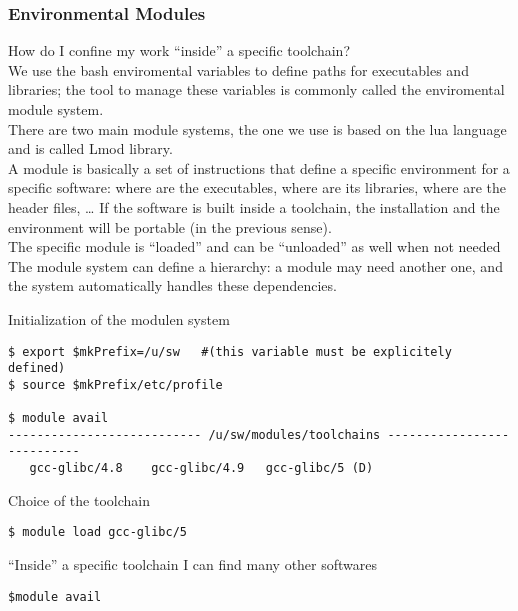 \documentclass[9pt]{beamer}
\begin{document}
\begin{frame}
\frametitle{Environmental Modules}

How do I confine my work “inside” a specific toolchain?\\[3mm]

We use the bash enviromental variables to define paths for executables and libraries; the tool to manage these variables is commonly called 
the enviromental module system.\\[3mm]

There are two main module systems, the one we use is based on the lua language and is called Lmod library.\\[3mm]

A module is basically a set of instructions that define a specific environment for a specific software: where are the executables, where are its libraries, where are the header files, … 
If the software is built inside a toolchain, the installation and the environment  will be portable (in the previous sense).\\[3mm]

The specific module is “loaded” and can be “unloaded” as well when not needed\\[3mm]

The module system can define a hierarchy: a module may need another one, and the system automatically handles these dependencies.

\end{frame}

\begin{frame}[fragile]

Initialization of the modulen  system

\begin{verbatim}
$ export $mkPrefix=/u/sw   #(this variable must be explicitely defined)
$ source $mkPrefix/etc/profile

$ module avail
--------------------------- /u/sw/modules/toolchains ---------------------------
   gcc-glibc/4.8	gcc-glibc/4.9	gcc-glibc/5 (D)
\end{verbatim}

Choice of the toolchain
\begin{verbatim}
$ module load gcc-glibc/5
\end{verbatim}

“Inside” a specific toolchain I can find many other softwares
\begin{verbatim}
$module avail
\end{verbatim}
\end{frame}
\end{document}
